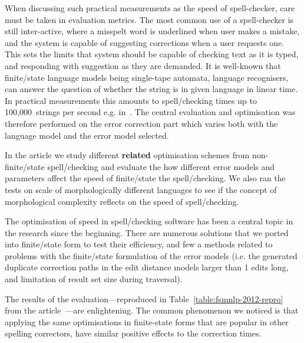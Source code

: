 \documentclass[officiallayout]{unihelcompling}
\begin{document}
When discussing such practical measurements as the speed of spell-checker, care
must be taken in evaluation metrics. The most common use of a spell-checker is
still inter-active, where a misspelt word is underlined when user makes a
mistake, and the system is capable of suggesting corrections when a user
requests one. This sets the limits that system should be capable of checking
text as it is typed, and responding with suggestion as they are demanded. It is
well-known that finite\-/state language models being single-tape automata,
language recognisers, can answer the question of whether the string is in given
language in linear time. In practical measurements this amounts to
spell\-/checking times up to 100,000~strings per second e.g.
in~\citet{silfverberg2009hfst}. The central evaluation and optimisation was
therefore performed on the error correction part which varies both with the
language model and the error model selected.

In the article we study different \textbf{related} optimisation schemes from
non-finite\-/state spell\-/checking and evaluate the how different error models and
parameters affect the speed of finite\-/state the spell\-/checking. We also ran the
tests on scale of morphologically different languages to see if the concept of
morphological complexity reflects on the speed of spell\-/checking.

The optimisation of speed in spell\-/checking software has been a central
topic in the research since the beginning. There are numerous solutions that we
ported into finite\-/state form to test their efficiency, and few a methods
related to problems with the finite\-/state formulation of the error models (i.e.
the generated duplicate correction paths in the edit distance models larger
than 1 edits long, and limitation of result set size during traversal).

The results of the evaluation---reproduced in
Table~\ref{table:fsmnlp-2012-repro} from the
article~---are enlightening. The common
phenomenon we noticed is that applying the same optimisations in finite-state
forms that are popular in other spelling correctors, have similar positive
effects to the correction times.
\end{document}
